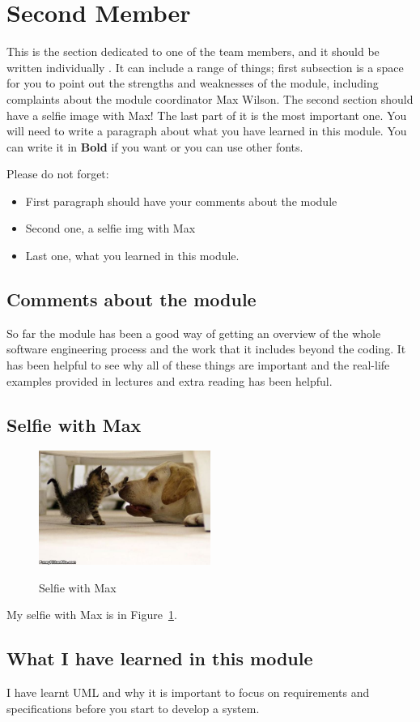 \section{Second Member}
This is the section dedicated to one of the team members, and it should be written individually . It can include a range of things; first subsection is a space for you to point out the strengths and weaknesses of the module, including complaints about the module coordinator Max Wilson. The second section should have a selfie image with Max! The last part of it is the most important one. You will need to write a paragraph about what you have learned in this module. You can write it in \textbf{Bold} if you want or you can use other fonts. 

Please do not forget:
\begin{itemize}
	\item First paragraph should have your comments about the module
	\item Second one, a selfie img with Max
	\item Last one, what you learned in this module.
\end{itemize}

\subsection{Comments about the module}
So far the module has been a good way of getting an overview of the whole software engineering process and the work that it includes beyond the coding. It has been helpful to see why all of these things are important and the real-life examples provided in lectures and extra reading has been helpful. 

\subsection{Selfie with Max}
\begin{figure}[h]
\caption{Selfie with Max}
\centering
\includegraphics[width=0.5\textwidth]{download}
\label{fig:selfie}
\end{figure}


My selfie with Max is in  Figure~\ref{fig:selfie}.

\subsection{What I have learned in this module}
I have learnt UML and why it is important to focus on requirements and specifications before you start to develop a system. 

